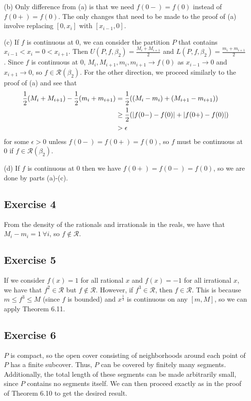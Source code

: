 (b) Only difference from (a) is that we need $f(0-) = f(0)$ instead of $f(0+) = f(0)$. The only changes that
need to be made to the proof of (a) involve replacing $[0, x_i]$ with $[x_{i-1}, 0]$.

(c) If $f$ is continuous at 0, we can consider the partition $P$ that contains $x_{i-1} < x_i = 0 < x_{i+1}$.
Then $U(P, f, \beta_2) = \frac{M_{i} + M_{i+1}}{2}$ and $L(P, f, \beta_2) = \frac{m_i + m_{i+1}}{2}$.
Since $f$ is continuous at 0, $M_i, M_{i+1}, m_i, m_{i+1} \to f(0)$ as $x_{i-1} \to 0$ and $x_{i+1} \to 0$,
so $f \in \mathscr{R}(\beta_2)$.
For the other direction, we proceed similarly to the proof of (a) and see that
\begin{align*}
        \frac{1}{2} (M_i + M_{i + 1}) - \frac{1}{2} (m_i + m_{i + 1}) &= \frac{1}{2} ((M_i - m_i) + (M_{i+1} - m_{i+1})) \\
                                                                      &\geq \frac{1}{2} (\abs{f(0-) - f(0)} + \abs{f(0+) - f(0)}) \\
                                                                      &> \epsilon
\end{align*}
for some $\epsilon > 0$ unless $f(0-) = f(0+) = f(0)$, so  $f$ must be continuous at 0 if  $f \in \mathscr{R}(\beta_2)$.

(d) If $f$ is continuous at 0 then we have $f(0+) = f(0-) = f(0)$, so we are done by parts (a)-(c).

\subsection{Exercise 4}
From the density of the rationals and irrationals in the reals, we have that $M_i - m_i = 1 \: \forall i$, so
$f \notin  \mathscr{R}$.

\subsection{Exercise 5}
If we consider $f(x) = 1$ for all rational $x$ and $f(x) = -1$ for all irrational $x$, we have that
$f^2 \in \mathscr{R}$ but $f \notin \mathscr{R}$. However, if $f^3 \in \mathscr{R}$, then $f \in \mathscr{R}$.
This is because $m \leq f^3 \leq M$ (since $f$ is bounded) and $x^{\frac{1}{3}}$ is continuous on any
$[m, M]$, so we can apply Theorem 6.11.

\subsection{Exercise 6}
$P$ is compact, so the open cover consisting of neighborhoods around each point of $P$ has a finite subcover.
Thus, $P$ can be covered by finitely many segments. Additionally, the total length of these segments can be
made arbitrarily small, since $P$ contains no segments itself. We can then proceed exactly as in the proof of
Theorem 6.10 to get the desired result.

